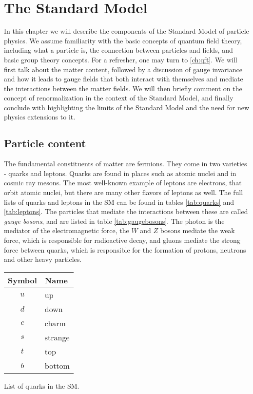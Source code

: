 \chapter{The Standard Model}\label{ch:sm}
In this chapter we will describe the components of the Standard Model of particle physics. We assume familiarity with the basic concepts of quantum field theory, including what a particle is, the connection between particles and fields, and basic group theory concepts. For a refresher, one may turn to \autoref{ch:qft}. We will first talk about the matter content, followed by a discussion of gauge invariance and how it leads to gauge fields that both interact with themselves and mediate the interactions between the matter fields. We will then briefly comment on the concept of renormalization in the context of the Standard Model, and finally conclude with highlighting the limits of the Standard Model and the need for new physics extensions to it.

\section{Particle content}
The fundamental constituents of matter are fermions. They come in two varieties - quarks and leptons. Quarks are found in places such as atomic nuclei and in cosmic ray mesons. The most well-known example of leptons are electrons, that orbit atomic nuclei, but there are many other flavors of leptons as well. The full lists of quarks and leptons in the SM can be found in tables \ref{tab:quarks} and \ref{tab:leptons}. The particles that mediate the interactions between these are called \emph{gauge bosons}, and are listed in table \ref{tab:gaugebosons}. The photon is the mediator of the electromagnetic force, the $W$ and $Z$ bosons mediate the weak force, which is responsible for radioactive decay, and gluons mediate the strong force between quarks, which is responsible for the formation of protons, neutrons and other heavy particles.

\begin{margintable}[-10cm]
  \centering
  \begin{tabular}{c|l}
    Symbol & Name \\
  \hline
    $u$ & up\\
    $d$ & down \\
    $c$ & charm \\
    $s$ & strange \\
    $t$ & top \\
    $b$ & bottom \\
  \end{tabular}
  \caption{List of quarks in the SM.}
  \label{tab:quarks}
\end{margintable}

